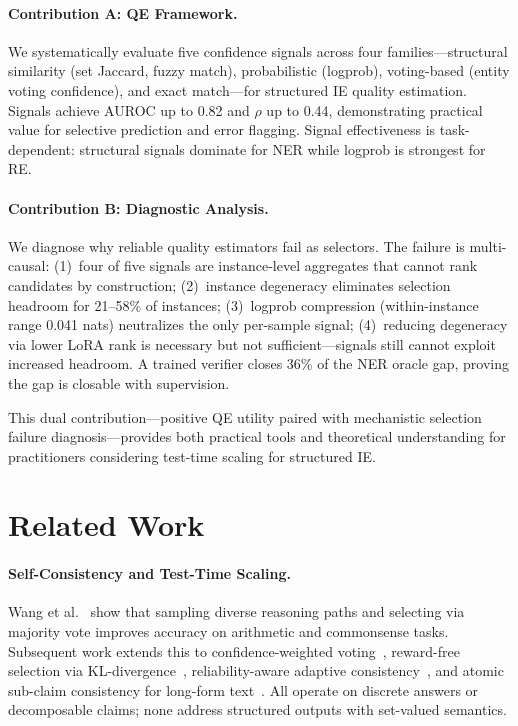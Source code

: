 \documentclass[11pt,a4paper]{article}
\begin{document}
\paragraph{Contribution A: QE Framework.} We systematically evaluate five confidence signals across four families---structural similarity (set Jaccard, fuzzy match), probabilistic (logprob), voting-based (entity voting confidence), and exact match---for structured IE quality estimation. Signals achieve AUROC up to 0.82 and $\rho$ up to 0.44, demonstrating practical value for selective prediction and error flagging. Signal effectiveness is task-dependent: structural signals dominate for NER while logprob is strongest for RE.

\paragraph{Contribution B: Diagnostic Analysis.} We diagnose why reliable quality estimators fail as selectors. The failure is multi-causal: (1)~four of five signals are instance-level aggregates that cannot rank candidates by construction; (2)~instance degeneracy eliminates selection headroom for 21--58\% of instances; (3)~logprob compression (within-instance range 0.041 nats) neutralizes the only per-sample signal; (4)~reducing degeneracy via lower LoRA rank is necessary but not sufficient---signals still cannot exploit increased headroom. A trained verifier closes 36\% of the NER oracle gap, proving the gap is closable with supervision.

This dual contribution---positive QE utility paired with mechanistic selection failure diagnosis---provides both practical tools and theoretical understanding for practitioners considering test-time scaling for structured IE.

\section{Related Work}

\paragraph{Self-Consistency and Test-Time Scaling.}
Wang et al.~\cite{wang2023selfconsistency} show that sampling diverse reasoning paths and selecting via majority vote improves accuracy on arithmetic and commonsense tasks. Subsequent work extends this to confidence-weighted voting~\cite{cisc2025}, reward-free selection via KL-divergence~\cite{selfcertainty2026}, reliability-aware adaptive consistency~\cite{reasc2026}, and atomic sub-claim consistency for long-form text~\cite{atomicsc2024}. All operate on discrete answers or decomposable claims; none address structured outputs with set-valued semantics.
\end{document}
